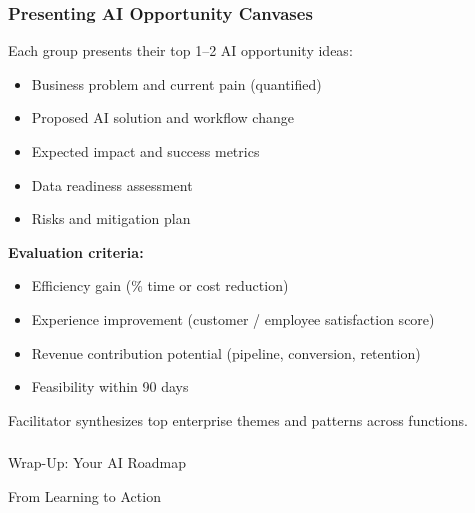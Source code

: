\begin{frame}[fragile]\frametitle{Presenting AI Opportunity Canvases}

Each group presents their top 1--2 AI opportunity ideas:
\begin{itemize}
  \item Business problem and current pain (quantified)
  \item Proposed AI solution and workflow change
  \item Expected impact and success metrics
  \item Data readiness assessment
  \item Risks and mitigation plan
\end{itemize}

\textbf{Evaluation criteria:}
\begin{itemize}
  \item Efficiency gain (\% time or cost reduction)
  \item Experience improvement (customer / employee satisfaction score)
  \item Revenue contribution potential (pipeline, conversion, retention)
  \item Feasibility within 90 days
\end{itemize}

Facilitator synthesizes top enterprise themes and patterns across functions.

\end{frame}


\begin{frame}[fragile]\frametitle{}
\begin{center}
{\Large Wrap-Up: Your AI Roadmap}

{\small From Learning to Action}
\end{center}
\end{frame}

